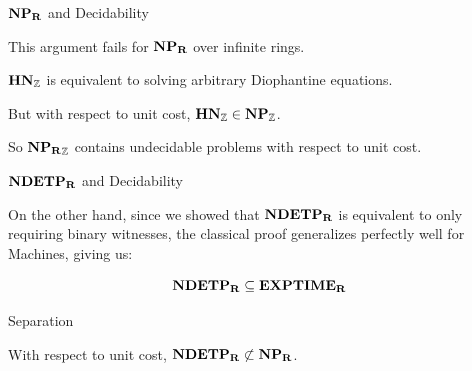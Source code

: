 \documentclass[c]{beamer}
\begin{document}
\begin{frame}{$\mathbf{NP_R}$ and Decidability}

  This argument fails for $\mathbf{NP_R}$ over infinite rings.\pause

  \vspace{\baselineskip}

  $\mathbf{HN}_{\mathbb{Z}}$ is equivalent to solving arbitrary Diophantine
  equations. \pause

  \vspace{\baselineskip}

  But with respect to unit cost, $\mathbf{HN}_{\mathbb{Z}} \in
  \mathbf{NP_{\mathbb{Z}}}$.

  \vspace{\baselineskip}

  So $\mathbf{NP_R}_{\mathbb{Z}}$ contains undecidable problems with respect to
  unit cost.

\end{frame}

\begin{frame}{$\mathbf{NDETP_R}$ and Decidability}

  On the other hand, since we showed that $\mathbf{NDETP_R}$ is equivalent to
  only requiring binary witnesses, the classical proof generalizes
  perfectly well for \ndet Machines, giving us:

  $$\mathbf{NDETP_R} \subseteq \mathbf{EXPTIME_R}$$
  
\end{frame}

\begin{frame}{Separation}
  
  \begin{corollary}
    With respect to unit cost, $\mathbf{NDETP_R} \not\subset \mathbf{NP_R}$.
  \end{corollary}
  
\end{frame}
\end{document}
